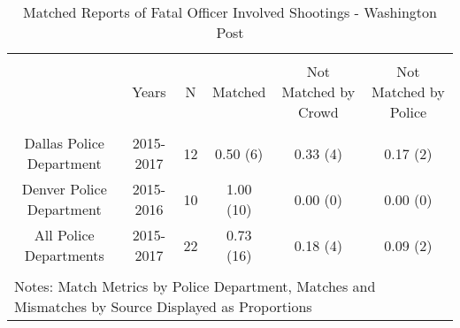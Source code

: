 
\begin{table}[!htbp] \centering 
  \caption{Matched Reports of Fatal Officer Involved Shootings - Washington Post} 
  \label{} 
\footnotesize 
\begin{tabular}{@{\extracolsep{5pt}} cccccc} 
\\[-1.8ex]\hline 
\hline \\[-1.8ex] 
 & Years & N & Matched & Not Matched by Crowd & Not Matched by Police \\ 
\hline \\[-1.8ex] 
Dallas Police Department & 2015-2017 & 12 & 0.50 (6) & 0.33 (4) & 0.17 (2) \\ 
Denver Police Department & 2015-2016 & 10 & 1.00 (10) & 0.00 (0) & 0.00 (0) \\ 
All Police Departments   & 2015-2017 & 22 & 0.73 (16) & 0.18 (4) & 0.09 (2) \\ 
\hline \\[-1.8ex] 
\multicolumn{6}{l}{Notes: Match Metrics by Police Department, Matches and Mismatches by Source Displayed as Proportions} \\ 
\end{tabular} 
\end{table}  
